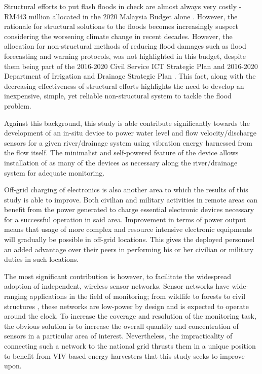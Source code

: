 \documentclass[oneside]{utmthesis}
\begin{document}
Structural efforts to put flash floods in check are almost always very costly - RM443 million allocated in the 2020 Malaysia Budget alone \citep{KementerianKewanganMalaysia2019}. However, the rationale for structural solutions to the floods becomes increasingly suspect considering the worsening climate change in recent decades. However, the allocation for non-structural methods of reducing flood damages such as flood forecasting and warning protocols, was not highlighted in this budget, despite them being part of the 2016-2020 Civil Service ICT Strategic Plan \citep{MAMPU2016} and 2016-2020 Department of Irrigation and Drainage Strategic Plan \citep{DIDMalaysia2016}. This fact, along with the decreasing effectiveness of structural efforts highlights the need to develop an inexpensive, simple, yet reliable non-structural system to tackle the flood problem.

Against this background, this study is able contribute significantly towards the development of an in-situ device to power water level and flow velocity/discharge sensors for a given river/drainage system using vibration energy harnessed from the flow itself. The minimalist and self-powered feature of the device allows installation of as many of the devices as necessary along the river/drainage system for adequate monitoring.


Off-grid charging of electronics is also another area to which the results of this study is able to improve. Both civilian and military activities in remote areas can benefit from the power generated to charge essential electronic devices necessary for a successful operation in said area. Improvement in terms of power output means that usage of more complex and resource intensive electronic equipments will gradually be possible in off-grid locations. This gives the deployed personnel an added advantage over their peers in performing his or her civilian or military duties in such locations.

The most significant contribution is however, to facilitate the widespread adoption of independent, wireless sensor networks. Sensor networks have wide-ranging applications in the field of monitoring; from wildlife \citep{Gazis2020,Pathak2020} to forests \citep{Kadir2019,Zellweger2019} to civil structures \citep{Ni2020,SadeghiEshkevari2020,Mao2020}, these networks are low-power by design and is expected to operate around the clock. To increase the coverage and resolution of the monitoring task, the obvious solution is to increase the overall quantity and concentration of sensors in a particular area of interest. Nevertheless, the impracticality of connecting such a network to the national grid thrusts them in a unique position to benefit from VIV-based energy harvesters that this study seeks to improve upon.
\end{document}
